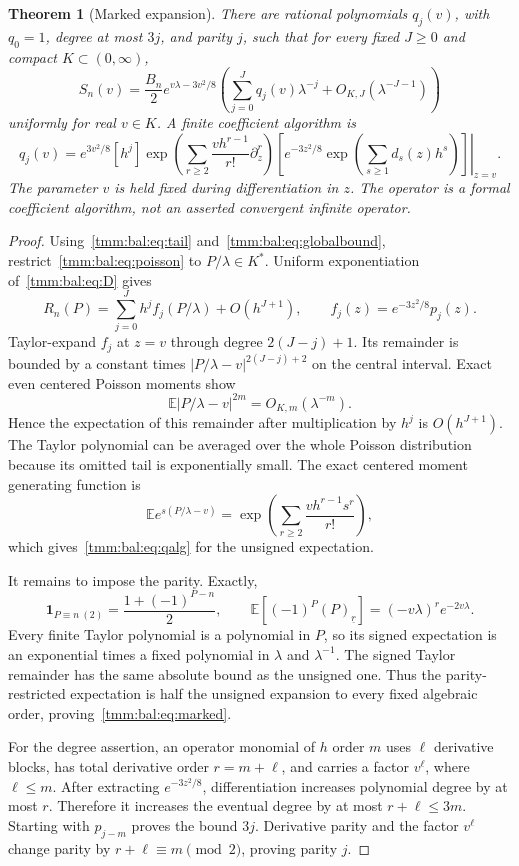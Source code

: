 \documentclass[11pt,letterpaper]{article}
\newtheorem{theorem}{Theorem}[section]
\theoremstyle{remark}\newtheorem{remark}[theorem]{Remark}
\newcommand{\E}{\mathbb E}\newcommand{\Pp}{\mathbb P}
\newcommand{\one}{\mathbf 1}\newcommand{\TV}{d_{\mathrm{TV}}}
\newcommand{\fall}[2]{(#1)_{\underline{#2}}}
\begin{document}
\begin{theorem}[Marked expansion]\label{tmm:bal:thm:marked}
There are rational polynomials $q_j(v)$, with $q_0=1$, degree at most $3j$, and parity $j$, such that for every fixed $J\ge0$ and compact $K\subset(0,\infty)$,
\begin{equation}\label{tmm:bal:eq:marked}
 S_n(v)=\frac{B_n}{2}e^{v\lambda-3v^2/8}
 \left(\sum_{j=0}^Jq_j(v)\lambda^{-j}
                    +O_{K,J}(\lambda^{-J-1})\right)
\end{equation}
uniformly for real $v\in K$. A finite coefficient algorithm is
\begin{equation}\label{tmm:bal:eq:qalg}
 q_j(v)=e^{3v^2/8}[h^j]\left.
 \exp\left(\sum_{r\ge2}\frac{v h^{r-1}}{r!}\partial_z^r\right)
 \left[e^{-3z^2/8}\exp\left(\sum_{s\ge1}d_s(z)h^s\right)\right]
 \right|_{z=v}.
\end{equation}
The parameter $v$ is held fixed during differentiation in $z$. The operator is a formal coefficient algorithm, not an asserted convergent infinite operator.
\end{theorem}
\begin{proof}
Using~\eqref{tmm:bal:eq:tail} and~\eqref{tmm:bal:eq:globalbound}, restrict~\eqref{tmm:bal:eq:poisson} to $P/\lambda\in K^*$. Uniform exponentiation of~\eqref{tmm:bal:eq:D} gives
\[
 R_n(P)=\sum_{j=0}^Jh^j f_j(P/\lambda)+O(h^{J+1}),
 \qquad f_j(z)=e^{-3z^2/8}p_j(z).
\]
Taylor-expand $f_j$ at $z=v$ through degree $2(J-j)+1$. Its remainder is bounded by a constant times $|P/\lambda-v|^{2(J-j)+2}$ on the central interval. Exact even centered Poisson moments show
\[
 \E|P/\lambda-v|^{2m}=O_{K,m}(\lambda^{-m}).
\]
Hence the expectation of this remainder after multiplication by $h^j$ is $O(h^{J+1})$. The Taylor polynomial can be averaged over the whole Poisson distribution because its omitted tail is exponentially small. The exact centered moment generating function is
\[
 \E e^{s(P/\lambda-v)}
   =\exp\left(\sum_{r\ge2}\frac{v h^{r-1}s^r}{r!}\right),
\]
which gives~\eqref{tmm:bal:eq:qalg} for the unsigned expectation.

It remains to impose the parity. Exactly,
\[
 \one_{P\equiv n\ (2)}=\frac{1+(-1)^{P-n}}2,
 \qquad \E[(-1)^P\fall P r]=(-v\lambda)^r e^{-2v\lambda}.
\]
Every finite Taylor polynomial is a polynomial in $P$, so its signed expectation is an exponential times a fixed polynomial in $\lambda$ and $\lambda^{-1}$. The signed Taylor remainder has the same absolute bound as the unsigned one. Thus the parity-restricted expectation is half the unsigned expansion to every fixed algebraic order, proving~\eqref{tmm:bal:eq:marked}.

For the degree assertion, an operator monomial of $h$ order $m$ uses $\ell$ derivative blocks, has total derivative order $r=m+\ell$, and carries a factor $v^\ell$, where $\ell\le m$. After extracting $e^{-3z^2/8}$, differentiation increases polynomial degree by at most $r$. Therefore it increases the eventual degree by at most $r+\ell\le3m$. Starting with $p_{j-m}$ proves the bound $3j$. Derivative parity and the factor $v^\ell$ change parity by $r+\ell\equiv m\pmod2$, proving parity $j$.
\end{proof}
\end{document}
